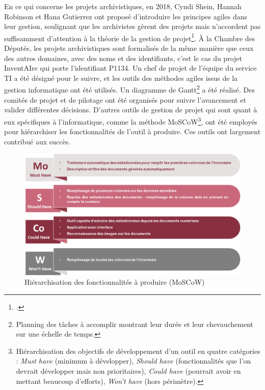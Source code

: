 En ce qui concerne les projets archivistiques, en 2018, Cyndi Shein,
Hannah Robinson et Hana Gutierrez ont proposé d'introduire les principes
agiles dans leur gestion, soulignant que les
archivistes gèrent des projets mais n'accordent pas suffisamment
d'attention à la théorie de la gestion de projet\footcite{shein_agility_2018}. À la Chambre des Députés, les
projets archivistiques sont formalisés de la même manière que ceux des
autres domaines, avec des noms et des identifiants, c'est le cas du
projet InventAIre qui porte l'identifiant P1134. Un chef de projet de
l'équipe du service TI a été désigné pour le suivre, et les outils des
méthodes agiles issus de la gestion informatique ont été utilisés. Un
diagramme de Gantt\footnote{Planning des tâches à accomplir montrant leur durée et leur chevauchement sur une échelle de temps.} a été réalisé. Des comités de projet et de pilotage
ont été organisés pour suivre l'avancement et valider différentes
décisions. D'autres outils
de gestion de projet qui sont quant à eux spécifiques à l'informatique,
comme la méthode MoSCoW\footnote{Hiérarchisation des objectifs de développement d'un outil en quatre catégories : \textit{Must have} (minimum à développer), \textit{Should have} (fonctionnalités que l'on devrait développer mais non prioritaires), \textit{Could have} (pourrait avoir en mettant beaucoup d'efforts), \textit{Won't have} (hors périmètre).}, ont été employés pour hiérarchiser les
fonctionnalités de l'outil à produire. Ces outils ont largement contribué aux succès.


\begin{figure}[h!]
	\centerline{\includegraphics[width=\textwidth]{./media/image3.png}}
	\caption{Hiérarchisation des fonctionnalités à produire (MoSCoW) }
\end{figure}



